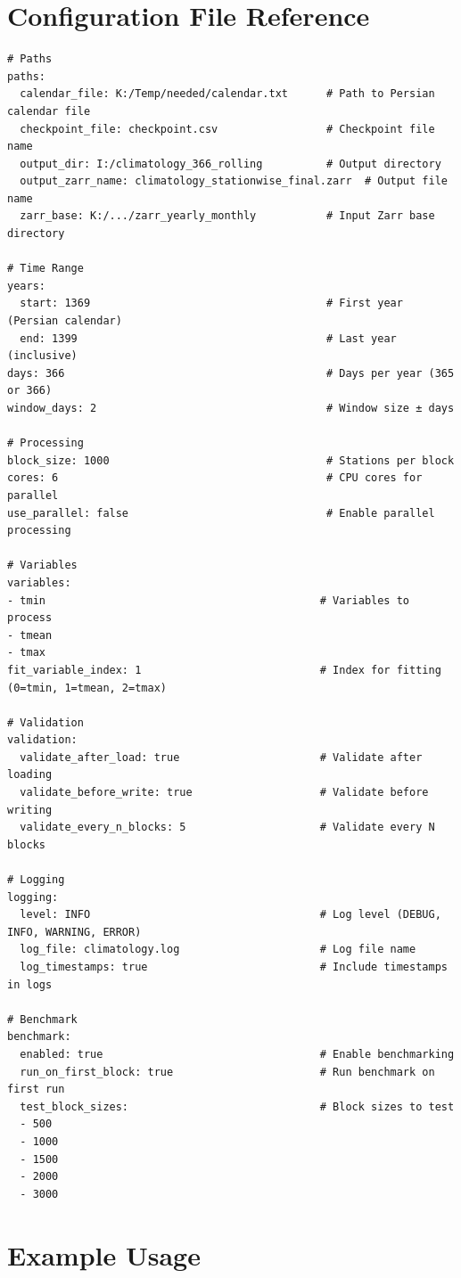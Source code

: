 ﻿\documentclass[12pt,a4paper]{report}
\begin{document}
\chapter{Configuration File Reference}
\begin{lstlisting}[caption=Full config.yaml with Descriptions]
# Paths
paths:
  calendar_file: K:/Temp/needed/calendar.txt      # Path to Persian calendar file
  checkpoint_file: checkpoint.csv                 # Checkpoint file name
  output_dir: I:/climatology_366_rolling          # Output directory
  output_zarr_name: climatology_stationwise_final.zarr  # Output file name
  zarr_base: K:/.../zarr_yearly_monthly           # Input Zarr base directory

# Time Range
years:
  start: 1369                                     # First year (Persian calendar)
  end: 1399                                       # Last year (inclusive)
days: 366                                         # Days per year (365 or 366)
window_days: 2                                    # Window size ± days

# Processing
block_size: 1000                                  # Stations per block
cores: 6                                          # CPU cores for parallel
use_parallel: false                               # Enable parallel processing

# Variables
variables:
- tmin                                           # Variables to process
- tmean
- tmax
fit_variable_index: 1                            # Index for fitting (0=tmin, 1=tmean, 2=tmax)

# Validation
validation:
  validate_after_load: true                      # Validate after loading
  validate_before_write: true                    # Validate before writing
  validate_every_n_blocks: 5                     # Validate every N blocks

# Logging
logging:
  level: INFO                                    # Log level (DEBUG, INFO, WARNING, ERROR)
  log_file: climatology.log                      # Log file name
  log_timestamps: true                           # Include timestamps in logs

# Benchmark
benchmark:
  enabled: true                                  # Enable benchmarking
  run_on_first_block: true                       # Run benchmark on first run
  test_block_sizes:                              # Block sizes to test
  - 500
  - 1000
  - 1500
  - 2000
  - 3000
\end{lstlisting}

\chapter{Example Usage}
\end{document}

